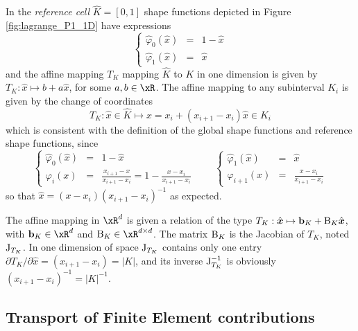 \medskip
In the \textit{reference cell} $\hat{K} = [0,1]$ shape functions depicted in Figure \ref{fig:lagrange_P1_1D} have expressions
\begin{equation*}
\left\lbrace
\begin{array}{lcl}
\hat\varphi_0(\hat x) &=& 1 - \hat x\\
\hat\varphi_1(\hat x) &=& \hat x
\end{array}
\right.
\end{equation*}
and the affine mapping $T_K$ mapping $\hat K$ to $K$ in one dimension is given by $T_K : \hat x \mapsto b + a \hat x$, for some $a, b\in\xR$.
The affine mapping to any subinterval $K_i$ is given by the change of coordinates
\begin{equation*}
T_K: \hat x \in \hat K \mapsto x = x_i + (x_{i+1} - x_{i}) \hat x \in K_i
\end{equation*}
which is consistent with the definition of the global shape functions and reference shape functions, since
\begin{equation*}
\left\lbrace
\begin{array}{lcl}
\hat\varphi_0(\hat x) &=& 1 - \hat x\\
\varphi_{i}(x)        &=& \displaystyle\frac{x_{i+1} - x}{x_{i+1} - x_{i}} = 1 - \frac{x - x_{i}}{x_{i+1} - x_{i}}
\end{array}
\right.
\qquad
\left\lbrace
\begin{array}{lcl}
\hat\varphi_1(\hat x) &=& \hat x\\
\varphi_{i+1}(x)      &=& \displaystyle\frac{x - x_{i}}{x_{i+1} - x_{i}}
\end{array}
\right.
\end{equation*}
so that $\hat x = (x - x_{i})(x_{i+1} - x_{i})^{-1}$ as expected.

\begin{rmrk} The affine mapping in $\xR^d$ is given a relation of the type $T_K : \hat {{{\boldsymbol x}}} \mapsto \mathbf b_K + {\mathrm B}_K \hat {{{\boldsymbol x}}}$, with $\vecb_K\in\xR^d$ and $\matB_K\in\xR^{d\times d}$.
The matrix ${\mathrm B}_K$ is the Jacobian of $T_K$, noted ${\mathrm J}_{T_K}$. In one dimension of space ${\mathrm J}_{T_K}$ contains only one entry $\partial T_K / \partial \hat{x} = (x_{i+1} - x_{i}) = |K|$, and its inverse ${\mathrm J}^{-1}_{T_K}$ is obviously $(x_{i+1} - x_{i})^{-1} = |K|^{-1}$.
\end{rmrk}

\subsection{Transport of Finite Element contributions}

